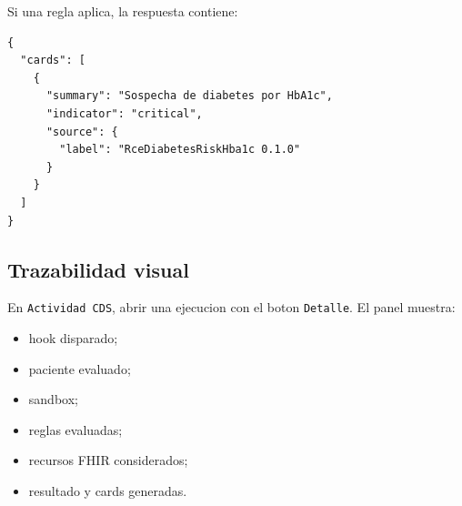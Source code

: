 Si una regla aplica, la respuesta contiene:

\begin{lstlisting}
{
  "cards": [
    {
      "summary": "Sospecha de diabetes por HbA1c",
      "indicator": "critical",
      "source": {
        "label": "RceDiabetesRiskHba1c 0.1.0"
      }
    }
  ]
}
\end{lstlisting}


\subsection{Trazabilidad visual}

En \texttt{Actividad CDS}, abrir una ejecucion con el boton \texttt{Detalle}.
El panel muestra:

\begin{itemize}
  \item hook disparado;
  \item paciente evaluado;
  \item sandbox;
  \item reglas evaluadas;
  \item recursos FHIR considerados;
  \item resultado y cards generadas.
\end{itemize}

